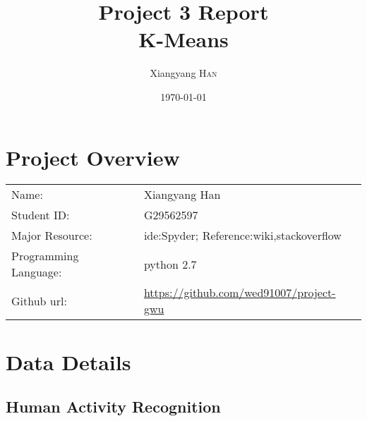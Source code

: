 \documentclass{article}
\title{Project 3 Report \\ K-Means} %
\author{Xiangyang \textsc{Han}} %
\date{\today} %
\begin{document}
\maketitle %



\section{Project Overview}


\begin{tabular}{ll}
Name:&Xiangyang Han\\
Student ID:&G29562597\\
Major Resource:&ide:Spyder; Reference:wiki,stackoverflow\\
Programming Language:&python 2.7\\
Github url:&\url{https://github.com/wed91007/project-gwu}
\end{tabular}




 

\section{Data Details}

\subsection{Human Activity Recognition}
\end{document}
